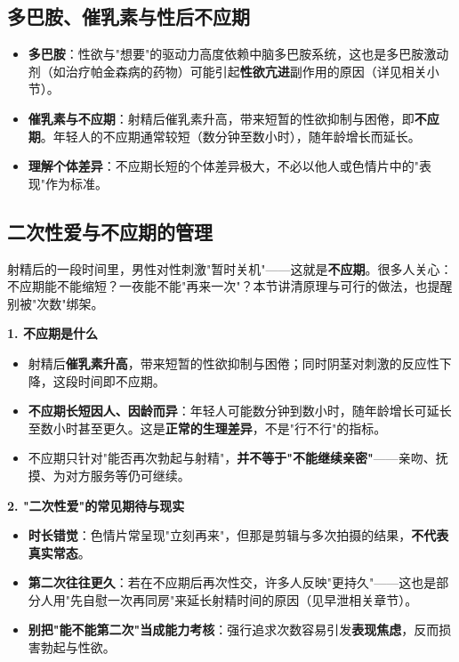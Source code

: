 \documentclass[12pt,a4paper,twoside]{ctexbook}
\begin{document}
\subsection{多巴胺、催乳素与性后不应期}

\begin{itemize}
	\item \textbf{多巴胺}：性欲与"想要"的驱动力高度依赖中脑多巴胺系统，这也是多巴胺激动剂（如治疗帕金森病的药物）可能引起\textbf{性欲亢进}副作用的原因（详见相关小节）。
	\item \textbf{催乳素与不应期}：射精后催乳素升高，带来短暂的性欲抑制与困倦，即\textbf{不应期}。年轻人的不应期通常较短（数分钟至数小时），随年龄增长而延长。
	\item \textbf{理解个体差异}：不应期长短的个体差异极大，不必以他人或色情片中的"表现"作为标准。
\end{itemize}

\subsection{二次性爱与不应期的管理}

射精后的一段时间里，男性对性刺激"暂时关机"——这就是\textbf{不应期}。很多人关心：不应期能不能缩短？一夜能不能"再来一次"？本节讲清原理与可行的做法，也提醒别被"次数"绑架。

\vspace{0.5em}
\noindent\textbf{1. 不应期是什么}

\begin{itemize}
	\item 射精后\textbf{催乳素升高}，带来短暂的性欲抑制与困倦；同时阴茎对刺激的反应性下降，这段时间即不应期。
	\item \textbf{不应期长短因人、因龄而异}：年轻人可能数分钟到数小时，随年龄增长可延长至数小时甚至更久。这是\textbf{正常的生理差异}，不是"行不行"的指标。
	\item 不应期只针对"能否再次勃起与射精"，\textbf{并不等于"不能继续亲密"}——亲吻、抚摸、为对方服务等仍可继续。
\end{itemize}

\noindent\textbf{2. "二次性爱"的常见期待与现实}

\begin{itemize}
	\item \textbf{时长错觉}：色情片常呈现"立刻再来"，但那是剪辑与多次拍摄的结果，\textbf{不代表真实常态}。
	\item \textbf{第二次往往更久}：若在不应期后再次性交，许多人反映"更持久"——这也是部分人用"先自慰一次再同房"来延长射精时间的原因（见早泄相关章节）。
	\item \textbf{别把"能不能第二次"当成能力考核}：强行追求次数容易引发\textbf{表现焦虑}，反而损害勃起与性欲。
\end{itemize}
\end{document}
